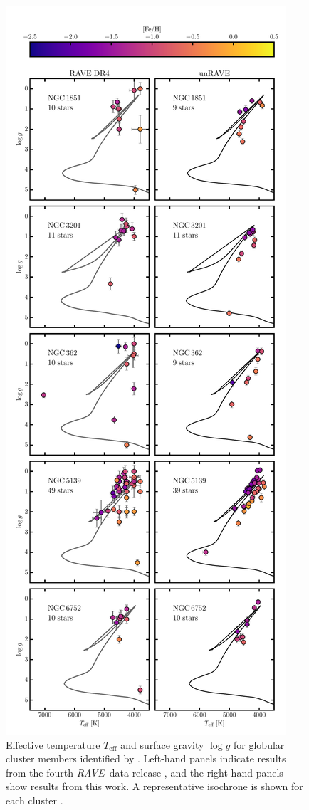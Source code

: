 \documentclass[preprint]{aastex}
\newcommand{\acronym}[1]{{\small{#1}}}
\newcommand{\project}[1]{\textsl{#1}}
\newcommand{\rave}{\project{\acronym{RAVE}}}
\newcommand{\teff}{T_{\mathrm{eff}}}
\newcommand{\logg}{\log g}
\begin{document}
\begin{figure}[p]
\center
\includegraphics[height=\textheight]{globular-clusters.pdf}
\caption{Effective temperature $\teff$ and surface gravity $\logg$ for globular cluster members identified by \citet{Kunder_2014,Anguiano_2015}.  Left-hand panels indicate results from the fourth \rave\ data release \citep{Kordopatis_2013}, and the right-hand panels show results from this work.  A representative isochrone is shown for each cluster \citep{Bressan_2012}.\label{fig:globular-cluster-HRD}}
\end{figure}
\end{document}
